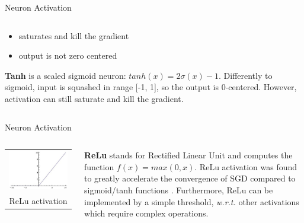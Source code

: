 \documentclass[aspectratio=169]{beamer}
\begin{document}
\begin{frame}{Neuron Activation}
\begin{columns}
\begin{column}{0.7\textwidth}
\begin{itemize}
\item saturates and kill the gradient
\item output is not zero centered
\end{itemize}
\textbf{Tanh} is a scaled sigmoid neuron: $tanh(x)=2\sigma(x)-1$. Differently to sigmoid, input is squashed in range [-1, 1], so the output is 0-centered. However, activation can still saturate and kill the gradient.
\end{column}
\end{columns}
\end{frame}


\begin{frame}{Neuron Activation}
\begin{columns}
\begin{column}{0.25\textwidth}
\begin{tabular}{c}
\includegraphics[width=\textwidth]{img/cnn/act_relu.jpg}\\
ReLu activation\\ 
\end{tabular}
\end{column}
\begin{column}{0.75\textwidth}
\textbf{ReLu} stands for Rectified Linear Unit and computes the function $f(x) = max(0, x)$. ReLu activation was found to greatly accelerate the convergence of SGD compared to sigmoid/tanh functions \cite{krizhevsky2012imagenet}. Furthermore, ReLu can be implemented by a simple threshold, \emph{w.r.t.} other activations which require complex operations.
\end{column}
\end{columns}
\end{frame}
\end{document}
